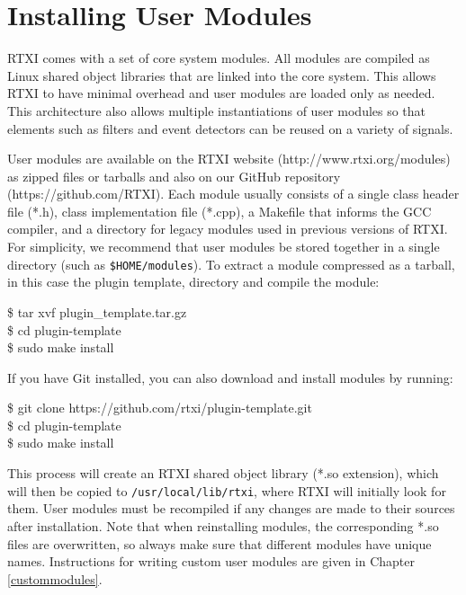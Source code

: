 \section{Installing User Modules}
\label{module installation}  
RTXI comes with a set of core system modules. All modules are compiled as Linux shared object libraries that are linked into the core system. This allows RTXI to have minimal overhead and user modules are loaded only as needed. This architecture also allows multiple instantiations of user modules so that elements such as filters and event detectors can be reused on a variety of signals. 

User modules are available on the RTXI website (http://www.rtxi.org/modules) as zipped files or tarballs and also on our GitHub repository (https://github.com/RTXI). Each module usually consists of a single class header file (*.h), class implementation file (*.cpp), a Makefile that informs the GCC compiler, and a directory for legacy modules used in previous versions of RTXI. For simplicity, we recommend that user modules be stored together in a single directory (such as \texttt{\$HOME/modules}). To extract a module compressed as a tarball, in this case the plugin template, directory and compile the module:
\begin{example}
\$ tar xvf plugin\_template.tar.gz\\
\$ cd plugin-template\\
\$ sudo make install
\end{example}

If you have Git installed, you can also download and install modules by running:
\begin{example}
\$ git clone https://github.com/rtxi/plugin-template.git\\
\$ cd plugin-template\\
\$ sudo make install\\
\end{example}

This process will create an RTXI shared object library (*.so extension), which will then be copied to \texttt{/usr/local/lib/rtxi}, where RTXI will initially look for them. User modules must be recompiled if any changes are made to their sources after installation. Note that when reinstalling modules, the corresponding *.so files are overwritten, so always make sure that different modules have unique names. Instructions for writing custom user modules are given in Chapter \ref{custommodules}.